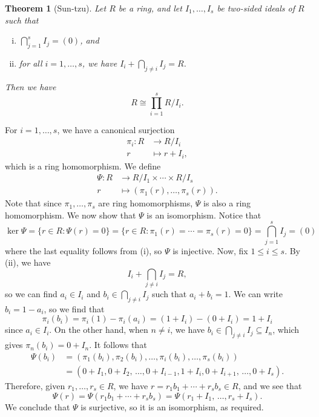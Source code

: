 \documentclass[10pt]{article}
\makeatletter
\numberwithin{equation}{section}
\theoremstyle{newstyle}
\newtheorem{thm}{Theorem}[section]
\newenvironment{pf}[1][\proofname]{\par
  \pushQED{\qed}%
  \normalfont \topsep0\p@\relax
  \trivlist
  \item[\hskip\labelsep\scshape
  #1\@addpunct{.}]\ignorespaces
}{%
  \popQED\endtrivlist\@endpefalse
}
\makeatother
\begin{document}
\begin{thm}[Sun-tzu]
Let $R$ be a ring, and let $I_1, \dots, I_s$ be two-sided ideals of $R$ such that 
\begin{enumerate}[(i)]
    \item $\bigcap_{j=1}^s I_j = (0)$, and 
    \item for all $i = 1, \dots, s$, we have $I_i + \bigcap_{j\neq i} I_j = R$. 
\end{enumerate}
Then we have 
\[ R \cong \prod_{i=1}^s R/I_i. \]
\end{thm}
\begin{pf}
For $i = 1, \dots, s$, we have a canonical surjection 
\begin{align*} \pi_i : R &\to R/I_i \\ r &\mapsto r + I_i, \end{align*}
which is a ring homomorphism. We define 
\begin{align*} \Psi : R &\to R/I_1 \times \cdots \times R/I_s \\ r &\mapsto (\pi_1(r), \dots, \pi_s(r)). 
\end{align*}
Note that since $\pi_1, \dots, \pi_s$ are ring homomorphisms, $\Psi$ is also a ring homomorphism. 
We now show that $\Psi$ is an isomorphism. Notice that 
\[ \ker\Psi = \{r \in R : \Psi(r) = 0\} = \{r \in R : \pi_1(r) = \cdots = \pi_s(r) = 0\} 
= \bigcap_{j=1}^s I_j = (0) \]
where the last equality follows from (i), so $\Psi$ is injective. Now, fix $1 \leq i \leq s$. 
By (ii), we have 
\[ I_i + \bigcap_{j\neq i} I_j = R, \]
so we can find $a_i \in I_i$ and $b_i \in \bigcap_{j\neq i} I_j$ such that $a_i + b_i = 1$. 
We can write $b_i = 1 - a_i$, so we find that 
\[ \pi_i(b_i) = \pi_i(1) - \pi_i(a_i) = (1 + I_i) - (0 + I_i) = 1 + I_i \]
since $a_i \in I_i$. 
On the other hand, when $n \neq i$, we have $b_i \in \bigcap_{j\neq i} I_j \subseteq I_n$, which 
gives $\pi_n(b_i) = 0 + I_n$. It follows that 
\begin{align*} \Psi(b_i) &= (\pi_1(b_i), \pi_2(b_i), \dots, \pi_i(b_i), \dots, \pi_s(b_i)) \\
&= (0 + I_1, 0 + I_2,\, \dots , 0 + I_{i-1}, 1 + I_i, 0 + I_{i+1},\, \dots, 0 + I_s). \end{align*}
Therefore, given $r_1, \dots, r_s \in R$, we have $r = r_1b_1 + \cdots + r_sb_s \in R$, and we see that
\[ \Psi(r) = \Psi(r_1b_1 + \cdots + r_sb_s) = \Psi(r_1 + I_1,\, \dots, r_s + I_s). \]
We conclude that $\Psi$ is surjective, so it is an isomorphism, as required. 
\end{pf}
\end{document}
